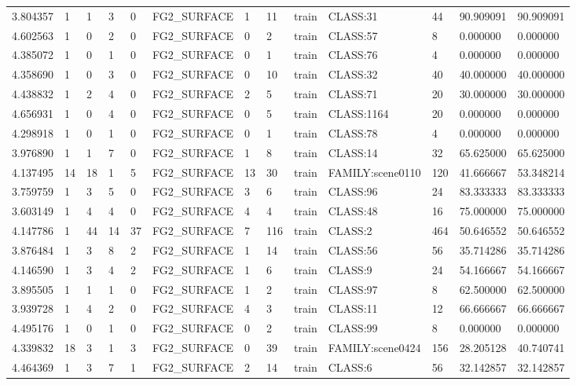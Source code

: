 \begin{tabular}{lllllllllllll}
3.804357 & 1 & 1 & 3 & 0 & FG2\_SURFACE & 1 & 11 & train & CLASS:31 & 44 & 90.909091 & 90.909091 \\
4.602563 & 1 & 0 & 2 & 0 & FG2\_SURFACE & 0 & 2 & train & CLASS:57 & 8 & 0.000000 & 0.000000 \\
4.385072 & 1 & 0 & 1 & 0 & FG2\_SURFACE & 0 & 1 & train & CLASS:76 & 4 & 0.000000 & 0.000000 \\
4.358690 & 1 & 0 & 3 & 0 & FG2\_SURFACE & 0 & 10 & train & CLASS:32 & 40 & 40.000000 & 40.000000 \\
4.438832 & 1 & 2 & 4 & 0 & FG2\_SURFACE & 2 & 5 & train & CLASS:71 & 20 & 30.000000 & 30.000000 \\
4.656931 & 1 & 0 & 4 & 0 & FG2\_SURFACE & 0 & 5 & train & CLASS:1164 & 20 & 0.000000 & 0.000000 \\
4.298918 & 1 & 0 & 1 & 0 & FG2\_SURFACE & 0 & 1 & train & CLASS:78 & 4 & 0.000000 & 0.000000 \\
3.976890 & 1 & 1 & 7 & 0 & FG2\_SURFACE & 1 & 8 & train & CLASS:14 & 32 & 65.625000 & 65.625000 \\
4.137495 & 14 & 18 & 1 & 5 & FG2\_SURFACE & 13 & 30 & train & FAMILY:scene0110 & 120 & 41.666667 & 53.348214 \\
3.759759 & 1 & 3 & 5 & 0 & FG2\_SURFACE & 3 & 6 & train & CLASS:96 & 24 & 83.333333 & 83.333333 \\
3.603149 & 1 & 4 & 4 & 0 & FG2\_SURFACE & 4 & 4 & train & CLASS:48 & 16 & 75.000000 & 75.000000 \\
4.147786 & 1 & 44 & 14 & 37 & FG2\_SURFACE & 7 & 116 & train & CLASS:2 & 464 & 50.646552 & 50.646552 \\
3.876484 & 1 & 3 & 8 & 2 & FG2\_SURFACE & 1 & 14 & train & CLASS:56 & 56 & 35.714286 & 35.714286 \\
4.146590 & 1 & 3 & 4 & 2 & FG2\_SURFACE & 1 & 6 & train & CLASS:9 & 24 & 54.166667 & 54.166667 \\
3.895505 & 1 & 1 & 1 & 0 & FG2\_SURFACE & 1 & 2 & train & CLASS:97 & 8 & 62.500000 & 62.500000 \\
3.939728 & 1 & 4 & 2 & 0 & FG2\_SURFACE & 4 & 3 & train & CLASS:11 & 12 & 66.666667 & 66.666667 \\
4.495176 & 1 & 0 & 1 & 0 & FG2\_SURFACE & 0 & 2 & train & CLASS:99 & 8 & 0.000000 & 0.000000 \\
4.339832 & 18 & 3 & 1 & 3 & FG2\_SURFACE & 0 & 39 & train & FAMILY:scene0424 & 156 & 28.205128 & 40.740741 \\
4.464369 & 1 & 3 & 7 & 1 & FG2\_SURFACE & 2 & 14 & train & CLASS:6 & 56 & 32.142857 & 32.142857 \\

\end{tabular}

